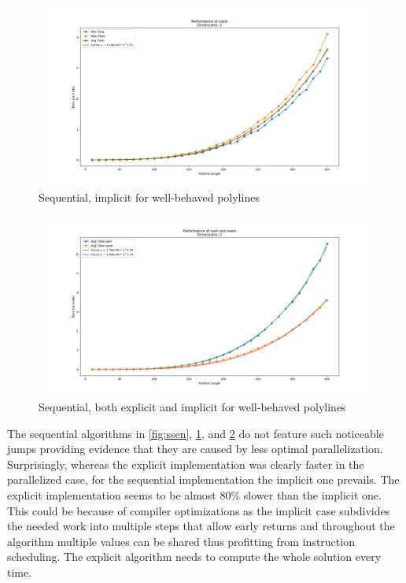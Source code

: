 \begin{figure}[ht]
  \centering
  \includegraphics[scale=0.5, width=\linewidth]{figures/ssein.png}
  \caption{Sequential, implicit for well-behaved polylines}
  \label{fig:ssein}
\end{figure}

\begin{figure}[ht]
  \centering
  \includegraphics[scale=0.5, width=\linewidth]{figures/ssen-ssein.png}
  \caption{Sequential, both explicit and implicit for well-behaved polylines}
  \label{fig:ssen-ssein}
\end{figure}

The sequential algorithms in \cref{fig:ssen}, \cref{fig:ssein}, and \cref{fig:ssen-ssein}  do not feature such noticeable jumps providing evidence that they are caused by less optimal parallelization. Surprisingly, whereas the explicit implementation was clearly faster in the parallelized case, for the sequential implementation the implicit one prevails. The explicit implementation seems to be almost 80\% slower than the implicit one. This could be because of compiler optimizations as the implicit case subdivides the needed work into multiple steps that allow early returns and throughout the algorithm multiple values can be shared thus profitting from instruction scheduling. The explicit algorithm needs to compute the whole solution every time.

